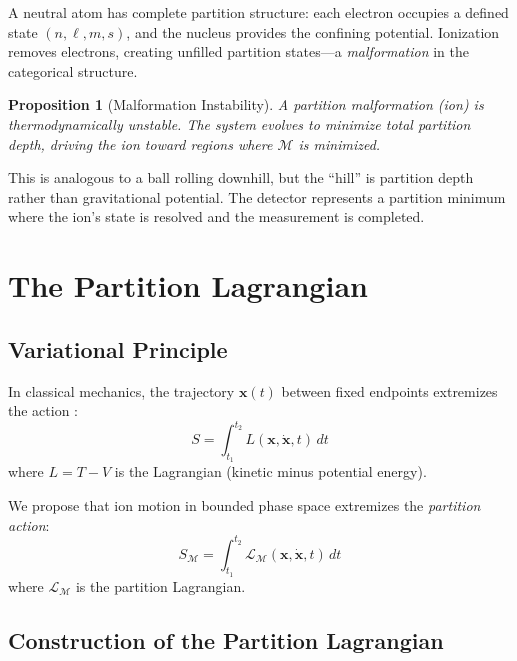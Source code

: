 \documentclass[twocolumn,10pt,a4paper]{article}
\newtheorem{proposition}[theorem]{Proposition}
\theoremstyle{definition}
\theoremstyle{remark}
\newcommand{\Mdepth}{\mathcal{M}}
\newcommand{\Lagr}{\mathcal{L}}
\begin{document}
A neutral atom has complete partition structure: each electron occupies a defined state $(n, \ell, m, s)$, and the nucleus provides the confining potential. Ionization removes electrons, creating unfilled partition states---a \emph{malformation} in the categorical structure.

\begin{proposition}[Malformation Instability]
\label{prop:malformation}
A partition malformation (ion) is thermodynamically unstable. The system evolves to minimize total partition depth, driving the ion toward regions where $\Mdepth$ is minimized.
\end{proposition}

This is analogous to a ball rolling downhill, but the ``hill'' is partition depth rather than gravitational potential. The detector represents a partition minimum where the ion's state is resolved and the measurement is completed.

\section{The Partition Lagrangian}
\label{sec:lagrangian}

\subsection{Variational Principle}

In classical mechanics, the trajectory $\mathbf{x}(t)$ between fixed endpoints extremizes the action \citep{landau1976}:
\begin{equation}
    S = \int_{t_1}^{t_2} L(\mathbf{x}, \dot{\mathbf{x}}, t) \, dt
    \label{eq:action}
\end{equation}
where $L = T - V$ is the Lagrangian (kinetic minus potential energy).

We propose that ion motion in bounded phase space extremizes the \emph{partition action}:
\begin{equation}
    S_{\Mdepth} = \int_{t_1}^{t_2} \Lagr_{\Mdepth}(\mathbf{x}, \dot{\mathbf{x}}, t) \, dt
    \label{eq:partition_action}
\end{equation}
where $\Lagr_{\Mdepth}$ is the partition Lagrangian.

\subsection{Construction of the Partition Lagrangian}
\end{document}
